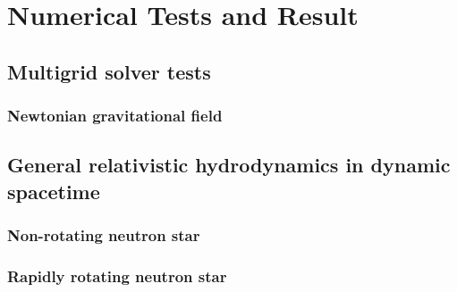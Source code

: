
\chapter{Numerical Tests and Result}  %

\ifpdf
    \graphicspath{{Chapter4/Figs/PDF/}{Chapter4/Figs/}}
\else
    \graphicspath{{Chapter4/Figs/}}
\fi


\section{Multigrid solver tests} %
\label{section4.1}
\subsection{Newtonian gravitational field}

\section{General relativistic hydrodynamics in dynamic spacetime} %
\label{section4.2}
\subsection{Non-rotating neutron star}
\subsection{Rapidly rotating neutron star}

